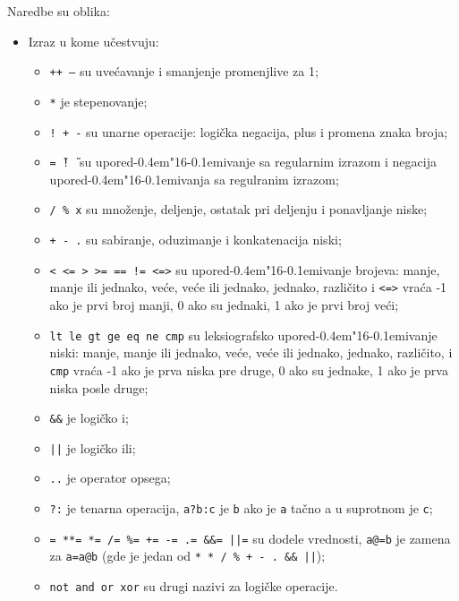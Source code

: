\documentclass[12pt,a4paper]{article}
\def\d{d\kern-0.4em\char"16\kern-0.1em}
\begin{document}
        Naredbe su oblika:
        \begin{itemize}
        \item
          Izraz u kome u\v cestvuju:
          \begin{itemize}
          \item
            {\tt++ --} su uve\'cavanje i smanjenje promenjlive za 1;
          \item
            {\tt**} je stepenovanje;
          \item
            {\tt! + -} su unarne operacije: logi\v cka negacija, plus i
            promena zna\-ka broja;
          \item
            {\tt=\~\  !\~\ } su upore\d ivanje sa regularnim izrazom i
            negacija upore\d i\-vanja sa regulranim izrazom;
          \item
            {\tt* / \% x} su mno\v zenje, deljenje, ostatak pri deljenju i
            ponavljanje niske;
          \item
            {\tt+ - .} su sabiranje, oduzimanje i konkatenacija niski;
          \item
            {\tt< <= > >= == != <=>} su upore\d ivanje brojeva: manje, manje
            ili jednako, ve\'ce, ve\'ce ili jednako, jednako, razli\v cito i
            {\tt<=>} vra\'ca -1 ako je prvi broj manji, 0 ako su jednaki, 1
            ako je prvi broj ve\'ci;
          \item
            {\tt lt le gt ge eq ne cmp} su leksiografsko upore\d ivanje
            niski: ma\-nje, manje ili jednako, ve\'ce, ve\'ce ili jednako,
            jednako, razli\v cito, i {\tt cmp} vra\'ca -1 ako je prva niska
            pre druge, 0 ako su jednake, 1 ako je prva niska posle druge;
          \item
            {\tt\&\&} je logi\v cko i;
          \item
            {\tt||} je logi\v cko ili;
          \item
            {\tt..} je operator opsega;
          \item
            {\tt?:} je tenarna operacija, {\tt a?b:c} je {\tt b} ako je
            {\tt a} ta\v cno a u suprotnom je {\tt c};
          \item
            {\tt= **= *= /= \%= += -= .= \&\&= ||=} su dodele vrednosti,
            {\tt a@=b} je zamena za {\tt a=a@b} (gde je {\tt@} jedan od
            {\tt** * / \% + - . \&\& ||});
          \item
            {\tt not and or xor} su drugi nazivi za logi\v cke operacije.

\end{itemize}
\end{itemize}
\end{document}
